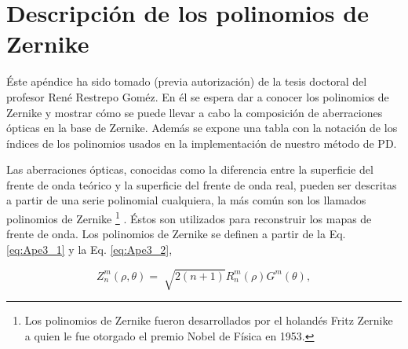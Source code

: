 



\chapter{Descripción de los polinomios de Zernike}
\label{cha:Anexo3}

\graphicspath{{Figures/ApendiceC/}{../Figures/ApendiceC/}}

Éste apéndice ha sido tomado (previa autorización) de la tesis doctoral del profesor René
Restrepo Goméz. En él se espera dar a conocer los polinomios de
Zernike y mostrar cómo se puede llevar a cabo la composición de aberraciones ópticas en la base
de Zernike. Además se expone una tabla con la notación de los índices
de los polinomios usados en la implementación de nuestro método
de PD.   

Las aberraciones ópticas, conocidas como la diferencia entre la superficie del frente de onda teórico y la superficie del frente de onda real, pueden ser descritas a partir de una serie polinomial cualquiera, la más común son los llamados polinomios de Zernike \footnote[3]{Los polinomios de Zernike fueron desarrollados por el holandés Fritz Zernike a quien le fue otorgado el premio Nobel de Física en 1953.} . Éstos son utilizados para reconstruir los mapas de frente de onda. Los polinomios de Zernike se  definen a partir de la Eq. \ref{eq:Ape3_1}  y la Eq. \ref{eq:Ape3_2},

\begin{equation}\label{eq:Ape3_1}
 Z_{n}^{m}(\rho,\theta) = \sqrt[]{2(n+1)} R_{n}^{m}(\rho)G^{m}(\theta),
\end{equation}

